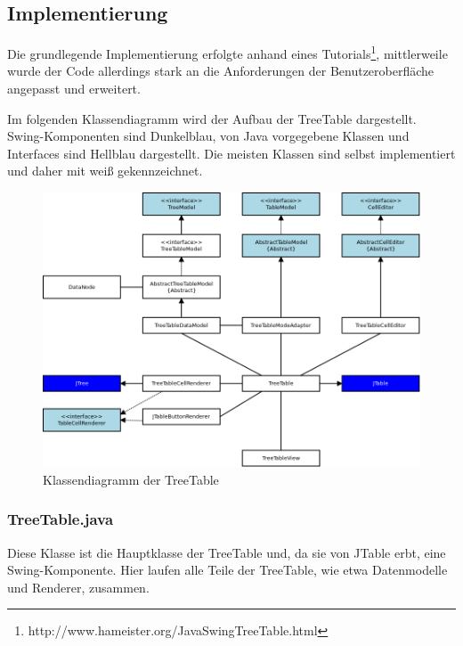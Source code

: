 \subsection{Implementierung}
Die grundlegende Implementierung erfolgte anhand eines Tutorials\footnote{http://www.hameister.org/JavaSwingTreeTable.html}, mittlerweile wurde der Code allerdings stark an die Anforderungen der Benutzeroberfläche angepasst und erweitert.

Im folgenden Klassendiagramm wird der Aufbau der TreeTable dargestellt. Swing-Komponenten sind Dunkelblau, von Java vorgegebene Klassen und Interfaces sind Hellblau dargestellt. Die meisten Klassen sind selbst implementiert und daher mit weiß gekennzeichnet.

\begin{figure}
\includegraphics[width=\textwidth]{./media/images/gui/var/TreeTableClasses.png}
\caption{Klassendiagramm der TreeTable}
\label{var_tt_class}
\end{figure}

\subsubsection*{TreeTable.java}
Diese Klasse ist die Hauptklasse der TreeTable und, da sie von JTable erbt, eine Swing-Komponente. Hier laufen alle Teile der TreeTable, wie etwa Datenmodelle und Renderer, zusammen.

